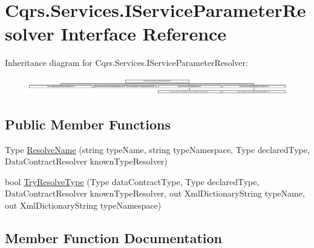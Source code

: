 \hypertarget{interfaceCqrs_1_1Services_1_1IServiceParameterResolver}{}\section{Cqrs.\+Services.\+I\+Service\+Parameter\+Resolver Interface Reference}
\label{interfaceCqrs_1_1Services_1_1IServiceParameterResolver}
Inheritance diagram for Cqrs.\+Services.\+I\+Service\+Parameter\+Resolver\+:\begin{figure}[H]
\begin{center}
\leavevmode
\includegraphics[height=0.763636cm]{interfaceCqrs_1_1Services_1_1IServiceParameterResolver}
\end{center}
\end{figure}
\subsection*{Public Member Functions}
\begin{DoxyCompactItemize}
\item 
Type \hyperlink{interfaceCqrs_1_1Services_1_1IServiceParameterResolver_a37c4b53616192e4e2f15ab4661ab99ae_a37c4b53616192e4e2f15ab4661ab99ae}{Resolve\+Name} (string type\+Name, string type\+Namespace, Type declared\+Type, Data\+Contract\+Resolver known\+Type\+Resolver)
\item 
bool \hyperlink{interfaceCqrs_1_1Services_1_1IServiceParameterResolver_a31c82a00b192b877faff6df99e1b689b_a31c82a00b192b877faff6df99e1b689b}{Try\+Resolve\+Type} (Type data\+Contract\+Type, Type declared\+Type, Data\+Contract\+Resolver known\+Type\+Resolver, out Xml\+Dictionary\+String type\+Name, out Xml\+Dictionary\+String type\+Namespace)
\end{DoxyCompactItemize}


\subsection{Member Function Documentation}
\mbox{\label{interfaceCqrs_1_1Services_1_1IServiceParameterResolver_a37c4b53616192e4e2f15ab4661ab99ae_a37c4b53616192e4e2f15ab4661ab99ae}} 
